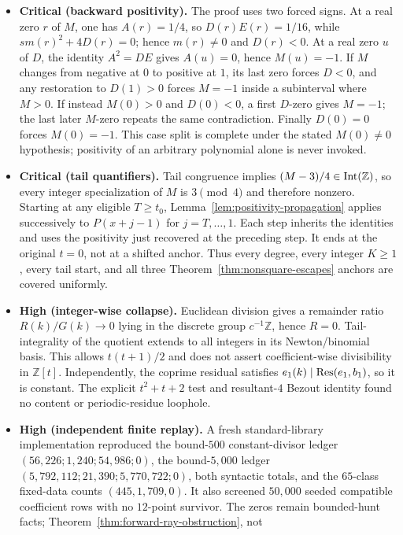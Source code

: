 \documentclass[10pt,reqno]{amsart}
\theoremstyle{definition}
\newcommand{\1}{\mathbf 1}
\begin{document}
\begin{itemize}[leftmargin=*]
\item \textbf{Critical (backward positivity).}  The proof uses two forced
signs.  At a real zero $r$ of $M$, one has $A(r)=1/4$, so
$D(r)E(r)=1/16$, while $s m(r)^2+4D(r)=0$; hence $m(r)\ne0$ and $D(r)<0$.
At a real zero $u$ of $D$, the identity $A^2=DE$ gives $A(u)=0$, hence
$M(u)=-1$.  If $M$ changes from negative at $0$ to positive at $1$, its last
zero forces $D<0$, and any restoration to $D(1)>0$ forces $M=-1$ inside a
subinterval where $M>0$.  If instead $M(0)>0$ and $D(0)<0$, a first
$D$-zero gives $M=-1$; the last later $M$-zero repeats the same
contradiction.  Finally $D(0)=0$ forces $M(0)=-1$.  This case split is
complete under the stated $M(0)\ne0$ hypothesis; positivity of an arbitrary
polynomial alone is never invoked.
\item \textbf{Critical (tail quantifiers).}  Tail congruence implies
$(M-3)/4\in{\rm Int}(\mathbb Z)$, so every integer specialization of $M$ is
$3\pmod4$ and therefore nonzero.  Starting at any eligible $T\geq t_0$,
Lemma~\ref{lem:positivity-propagation} applies successively to $P(x+j-1)$ for
$j=T,\ldots,1$.  Each step inherits the identities and uses the positivity
just recovered at the preceding step.  It ends at the original $t=0$, not
at a shifted anchor.  Thus every degree, every integer $K\geq1$, every tail
start, and all three Theorem~\ref{thm:nonsquare-escapes} anchors are covered
uniformly.
\item \textbf{High (integer-wise collapse).}  Euclidean division gives a
remainder ratio $R(k)/G(k)\to0$ lying in the discrete group
$c^{-1}\mathbb Z$, hence $R=0$.  Tail-integrality of the quotient extends to
all integers in its Newton/binomial basis.  This allows $t(t+1)/2$ and does
not assert coefficient-wise divisibility in $\mathbb Z[t]$.  Independently,
the coprime residual satisfies
$e_1(k)\mid{\rm Res}(e_1,b_1)$, so it is constant.  The explicit
$t^2+t+2$ test and resultant-$4$ Bezout identity found no content or
periodic-residue loophole.
\item \textbf{High (independent finite replay).}  A fresh standard-library
implementation reproduced the bound-$500$ constant-divisor ledger
$(56{,}226;1{,}240;54{,}986;0)$, the bound-$5{,}000$ ledger
$(5{,}792{,}112;21{,}390;5{,}770{,}722;0)$, both syntactic totals, and the
$65$-class fixed-data counts $(445,1{,}709,0)$.  It also screened $50{,}000$
seeded compatible coefficient rows with no $12$-point survivor.  The zeros
remain bounded-hunt facts; Theorem~\ref{thm:forward-ray-obstruction}, not

\end{itemize}
\end{document}
